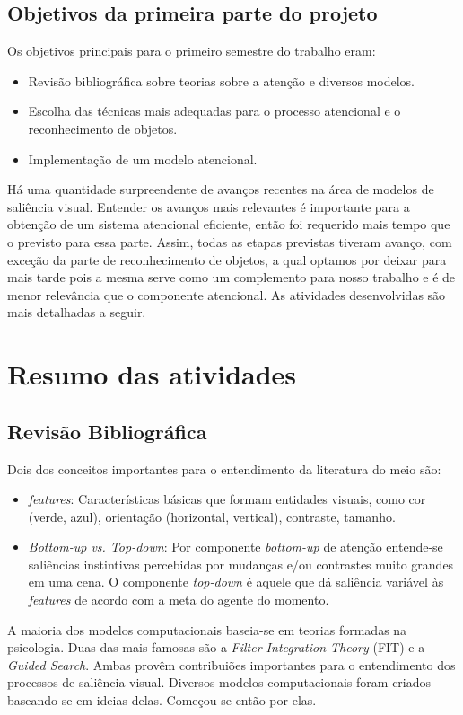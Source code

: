 \documentclass[11pt]{article}
\newcommand{\tit}[1]{\textit{#1}}
\begin{document}
\subsection{Objetivos da primeira parte do projeto}
Os objetivos principais para o primeiro semestre do trabalho eram:
\begin{itemize}
    \item Revisão bibliográfica sobre teorias sobre a atenção e diversos
        modelos.
    \item Escolha das técnicas mais adequadas para o processo atencional
        e o reconhecimento de objetos.
    \item Implementação de um modelo atencional.
\end{itemize}
Há uma quantidade surpreendente de avanços recentes na área de modelos
de saliência visual.
Entender os avanços mais relevantes é importante para a obtenção de um sistema
atencional eficiente, então foi requerido mais tempo que o previsto para
essa parte.
Assim, todas as etapas previstas tiveram avanço, com exceção da parte de
reconhecimento de objetos, a qual optamos por deixar para mais tarde pois
a mesma serve como um complemento para nosso trabalho e é de menor relevância
que o componente atencional.
As atividades desenvolvidas são mais detalhadas a seguir.

\section{Resumo das atividades}
\subsection{Revisão Bibliográfica}
Dois dos conceitos importantes para o entendimento da literatura do meio são:
\begin{itemize}
    \item \tit{features}: Características básicas que formam entidades
        visuais, como cor (verde, azul), orientação (horizontal, vertical),
        contraste, tamanho.
    \item \tit{Bottom-up vs. Top-down}: Por componente \tit{bottom-up} de
        atenção entende-se saliências instintivas percebidas por mudanças
        e/ou contrastes muito grandes em uma cena. O componente \tit{top-down}
        é aquele que dá saliência variável às \tit{features} de acordo
        com a meta do agente do momento.
\end{itemize}
A maioria dos modelos computacionais baseia-se em teorias formadas na
psicologia.
Duas das mais famosas são a \tit{Filter Integration Theory} (FIT) e a
\tit{Guided Search}.
Ambas provêm contribuiões importantes para o entendimento dos processos
de saliência visual.
Diversos modelos computacionais foram criados baseando-se em ideias delas.
Começou-se então por elas.
\end{document}
